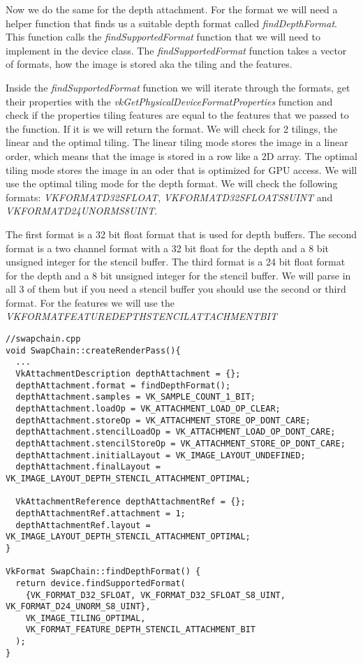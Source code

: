 \documentclass[12pt]{report} \usepackage{preamble}
\begin{document}
Now we do the same for the depth attachment. For the format we will need a helper function that finds us a suitable
depth format called \textit{findDepthFormat}. This function calls the \textit{findSupportedFormat} function that we
will need to implement in the device class. The \textit{findSupportedFormat} function takes a vector of formats,
how the image is stored aka the tiling and the features.

Inside the \textit{findSupportedFormat} function we will iterate through the formats, get their properties with the
\textit{vkGetPhysicalDeviceFormatProperties} function and check if the properties tiling features are equal to the
features that we passed to the function. If it is we will return the format. We will check for 2 tilings,
the linear and the optimal tiling. The linear tiling mode stores the image in a linear order, which means that the
image is stored in a row like a 2D array. The optimal tiling mode stores the image in an oder that is optimized for
\ac{GPU} access. We will use the optimal tiling mode for the depth format. We will check the following formats:
\textit{VK\textunderscore FORMAT\textunderscore D32\textunderscore SFLOAT},
\textit{VK\textunderscore FORMAT\textunderscore D32\textunderscore SFLOAT\textunderscore S8\textunderscore UINT} and
\textit{VK\textunderscore FORMAT\textunderscore D24\textunderscore UNORM\textunderscore S8\textunderscore UINT}.

The first format is a 32 bit float format that is used for depth buffers. The second format is a two channel format
with a 32 bit float for the depth and a 8 bit unsigned integer for the stencil buffer. The third format is a 24 bit
float format for the depth and a 8 bit unsigned integer for the stencil buffer. We will parse in all 3 of them but if you need
a stencil buffer you should use the second or third format. For the features we will use the
\textit{VK\textunderscore FORMAT\textunderscore FEATURE\textunderscore DEPTH\textunderscore STENCIL\textunderscore ATTACHMENT\textunderscore BIT}

\begin{lstlisting}[Language=C++]
//swapchain.cpp
void SwapChain::createRenderPass(){
  ...
  VkAttachmentDescription depthAttachment = {};
  depthAttachment.format = findDepthFormat();
  depthAttachment.samples = VK_SAMPLE_COUNT_1_BIT;
  depthAttachment.loadOp = VK_ATTACHMENT_LOAD_OP_CLEAR;
  depthAttachment.storeOp = VK_ATTACHMENT_STORE_OP_DONT_CARE;
  depthAttachment.stencilLoadOp = VK_ATTACHMENT_LOAD_OP_DONT_CARE;
  depthAttachment.stencilStoreOp = VK_ATTACHMENT_STORE_OP_DONT_CARE;
  depthAttachment.initialLayout = VK_IMAGE_LAYOUT_UNDEFINED;
  depthAttachment.finalLayout = VK_IMAGE_LAYOUT_DEPTH_STENCIL_ATTACHMENT_OPTIMAL;

  VkAttachmentReference depthAttachmentRef = {};
  depthAttachmentRef.attachment = 1;
  depthAttachmentRef.layout = VK_IMAGE_LAYOUT_DEPTH_STENCIL_ATTACHMENT_OPTIMAL;
}

VkFormat SwapChain::findDepthFormat() {
  return device.findSupportedFormat(
    {VK_FORMAT_D32_SFLOAT, VK_FORMAT_D32_SFLOAT_S8_UINT, VK_FORMAT_D24_UNORM_S8_UINT},
    VK_IMAGE_TILING_OPTIMAL,
    VK_FORMAT_FEATURE_DEPTH_STENCIL_ATTACHMENT_BIT
  );
}
\end{lstlisting}
\end{document}
